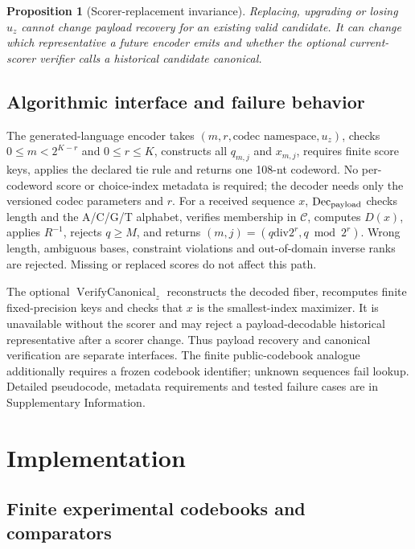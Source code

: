 \documentclass[unnumsec,webpdf,modern,large]{oup-authoring-template}
\newtheorem{proposition}{Proposition}
\begin{document}
\begin{proposition}[Scorer-replacement invariance]
Replacing, upgrading or losing $u_z$ cannot change payload recovery for an existing valid candidate. It can change which representative a future encoder emits and whether the optional current-scorer verifier calls a historical candidate canonical.
\end{proposition}

\subsection{Algorithmic interface and failure behavior}

The generated-language encoder takes $(m,r,\text{codec namespace},u_z)$, checks $0\leq m<2^{K-r}$ and $0\leq r\leq K$, constructs all $q_{m,j}$ and $x_{m,j}$, requires finite score keys, applies the declared tie rule and returns one 108-nt codeword. No per-codeword score or choice-index metadata is required; the decoder needs only the versioned codec parameters and $r$. For a received sequence $x$, $\operatorname{Dec}_{\rm payload}$ checks length and the A/C/G/T alphabet, verifies membership in $\mathcal C$, computes $D(x)$, applies $R^{-1}$, rejects $q\geq M$, and returns $(m,j)=(q\mathbin{\mathrm{div}}2^r,q\bmod2^r)$. Wrong length, ambiguous bases, constraint violations and out-of-domain inverse ranks are rejected. Missing or replaced scores do not affect this path.

The optional $\operatorname{VerifyCanonical}_z$ reconstructs the decoded fiber, recomputes finite fixed-precision keys and checks that $x$ is the smallest-index maximizer. It is unavailable without the scorer and may reject a payload-decodable historical representative after a scorer change. Thus payload recovery and canonical verification are separate interfaces. The finite public-codebook analogue additionally requires a frozen codebook identifier; unknown sequences fail lookup. Detailed pseudocode, metadata requirements and tested failure cases are in Supplementary Information.

\section{Implementation}

\subsection{Finite experimental codebooks and comparators}
\end{document}
